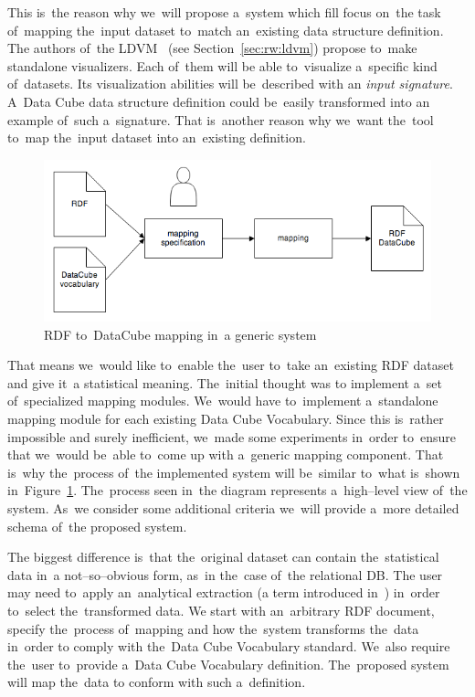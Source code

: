 This is~the reason why we~will propose a~system which fill focus on~the task of~mapping the~input dataset to~match an~existing data structure definition. 
The authors of~the LDVM~\cite{ldvm} (see Section~\ref{sec:rw:ldvm}) propose to~make standalone
visualizers. Each of~them will 
be able to~visualize a~specific kind of~datasets. Its visualization abilities will be~described with
an \emph{input signature}. A~Data Cube data structure definition could be~easily transformed into
an example of~such a~signature. That is~another reason why we~want the~tool to~map the~input dataset into an~existing definition.

\begin{figure}
	\centering
	\includegraphics[width=140mm]{img/generic-mapping.png}
	\caption{RDF to~DataCube mapping in~a generic system}
	\label{fig:generic-mapping}
\end{figure}

That means we~would like to~enable the~user to~take an~existing RDF
dataset and give it~a statistical meaning. The~initial thought was to
implement a~set of~specialized 
mapping modules. We~would have to~implement a~standalone mapping module for
each existing Data Cube Vocabulary. Since this is~rather impossible and 
surely inefficient, we~made some experiments in~order to~ensure that we~would be~able to~come 
up with a~generic mapping component. That is~why the~process of~the implemented
system will be~similar to~what is~shown in~Figure~\ref{fig:generic-mapping}. The~process seen in~the diagram represents a~high--level view of~the system. As~we 
consider some additional criteria we~will provide a~more detailed schema of~the 
proposed system. 

The biggest difference is~that the~original dataset can contain the~statistical 
data in~a not--so--obvious form, as~in the~case of~the relational DB.
The user may need to~apply an~analytical 
extraction (a term introduced in~\cite{ldvm}) in~order to~select the~transformed data.
We start with an~arbitrary RDF document, 
specify the~process of~mapping and how the~system transforms the~data in~order
to comply with the~Data Cube Vocabulary standard. We~also require the~user to~provide a~Data Cube Vocabulary definition. The~proposed system will map the~data
to conform with such a~definition.

